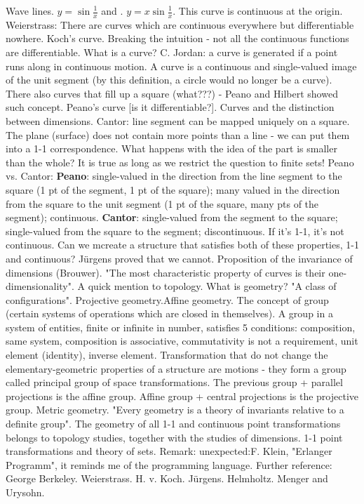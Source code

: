 \documentclass{cornell}
\begin{document}
%
{Wave lines. \( y = \sin\frac{1}{x}\) and . \( y = x\sin\frac{1}{x}\). This curve is continuous at the origin. Weierstrass: There are curves which are continuous everywhere but differentiable nowhere. Koch's curve. Breaking the intuition - not all the continuous functions are differentiable. What is a curve? C. Jordan: a curve is generated if a point runs along in continuous motion. A curve is a continuous and single-valued image of the unit segment (by this definition, a circle would no longer be a curve). There also curves that fill up a square (what???) - Peano and Hilbert showed such concept. Peano's curve [is it differentiable?]. Curves and the distinction between dimensions. Cantor: line segment can be mapped uniquely on a square. The plane (surface) does not contain more points than a line - we can put them into a 1-1 correspondence. What happens with the idea of the part is smaller than the whole? It is true as long as we restrict the question to finite sets!}%
{Peano vs. Cantor: \textbf{Peano}: single-valued in the direction from the line segment to the square (1 pt of the segment, 1 pt of the square); many valued in the direction from the square to the unit segment (1 pt of the square, many pts of the segment); continuous. \textbf{Cantor}: single-valued from the segment to the square; single-valued from the square to the segment; discontinuous. If it's 1-1, it's not continuous. Can we mcreate a structure that satisfies both of these properties, 1-1 and continuous? Jürgens proved that we cannot. Proposition of the invariance of dimensions (Brouwer). "The most characteristic property of curves is their one-dimensionality". A quick mention to topology. What is geometry? "A class of configurations". Projective geometry.Affine geometry. The concept of group (certain systems of operations which are closed in themselves). A group in a system of entities, finite or infinite in number, satisfies 5 conditions: composition, same system, composition is associative, commutativity is not a requirement, unit element (identity), inverse element. Transformation that do not change the elementary-geometric properties of a structure are motions - they form a group called principal group of space transformations. The previous group + parallel projections is the affine group. Affine group + central projections is the projective group. Metric geometry. "Every geometry is a theory of invariants relative to a definite group". The geometry of all 1-1 and continuous point transformations belongs to topology studies, together with the studies of dimensions. 1-1 point transformations and theory of sets. }%
{Remark: unexpected:F. Klein, "Erlanger Programm", it reminds me of the programming language. }%
{Further reference: George Berkeley. Weierstrass. H. v. Koch. Jürgens. Helmholtz. Menger and Urysohn.}%
\end{document}
